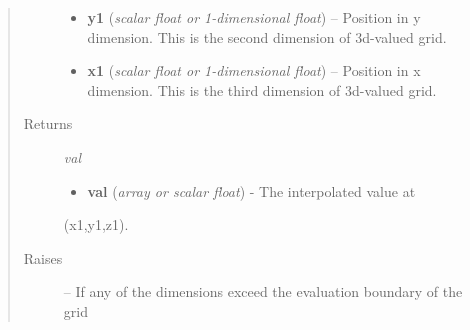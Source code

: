 \documentclass[letterpaper,10pt,english]{sphinxmanual}
\begin{document}
\begin{fulllineitems}
\begin{fulllineitems}
\begin{quote}
\begin{description}
\begin{itemize}
\item {} 
\textbf{y1} (\emph{scalar float or 1-dimensional float}) --
Position in y dimension.
This is the second dimension of 3d-valued grid.

\item {} 
\textbf{x1} (\emph{scalar float or 1-dimensional float}) --
Position in x dimension.
This is the third dimension of 3d-valued grid.

\end{itemize}

\item[{Returns}] \leavevmode

\emph{val}
\begin{itemize}
\item {} 
\textbf{val} (\emph{array or scalar float}) - The interpolated value at

\end{itemize}

(x1,y1,z1).


\item[{Raises}] \leavevmode
{} -- 
If any of the dimensions exceed the evaluation boundary
of the grid

\end{description}\end{quote}

\end{fulllineitems}


\end{fulllineitems}

\end{document}
